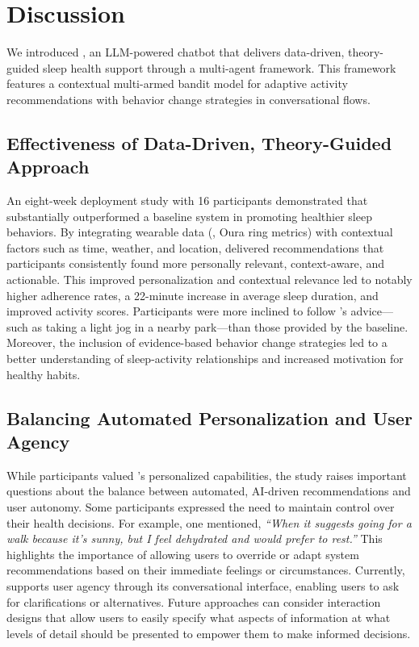 \section{Discussion}\label{sec.discussion}
We introduced \name{}, an LLM-powered chatbot that delivers data-driven, theory-guided sleep health support through a multi-agent framework. This framework features a contextual multi-armed bandit model for adaptive activity recommendations with behavior change strategies in conversational flows.

\subsection{Effectiveness of Data-Driven, Theory-Guided Approach}
An eight-week deployment study with 16 participants demonstrated that \name{} substantially outperformed a baseline system in promoting healthier sleep behaviors. 
By integrating wearable data (\eg, Oura ring metrics) with contextual factors such as time, weather, and location, \name{} delivered recommendations that participants consistently found more personally relevant, context-aware, and actionable.
This improved personalization and contextual relevance led to notably higher adherence rates, a 22-minute increase in average sleep duration, and improved activity scores. 
Participants were more inclined to follow \name{}’s advice—such as taking a light jog in a nearby park—than those provided by the baseline.
Moreover, the inclusion of evidence-based behavior change strategies led to a better understanding of sleep-activity relationships and increased motivation for healthy habits.


\subsection{Balancing Automated Personalization and User Agency}
While participants valued \name{}'s personalized capabilities, the study raises important questions about the balance between automated, AI-driven recommendations and user autonomy. 
Some participants expressed the need to maintain control over their health decisions. 
For example, one mentioned,
\textit{``When it suggests going for a walk because it's sunny, but I feel dehydrated and would prefer to rest.''} This highlights the importance of allowing users to override or adapt system recommendations based on their immediate feelings or circumstances.
Currently, \name{} supports user agency through its conversational interface, enabling users to ask for clarifications or alternatives.
Future approaches can consider interaction designs that allow users to easily specify what aspects of information at what levels of detail should be presented to empower them to make informed decisions.

